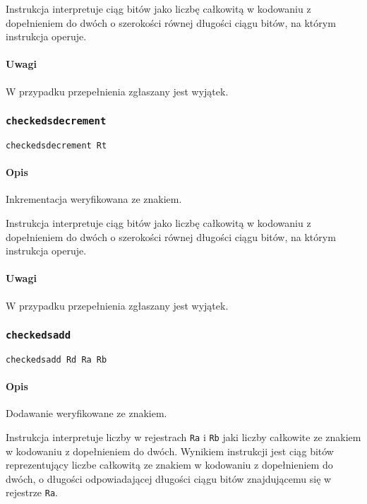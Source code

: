 Instrukcja interpretuje ciąg bitów jako liczbę całkowitą w kodowaniu z
dopełnieniem do dwóch o szerokości równej długości ciągu bitów, na którym
instrukcja operuje.

\paragraph*{Uwagi}

W przypadku przepełnienia zgłaszany jest wyjątek.

\subsubsection{\texttt{checkedsdecrement}}

\begin{lstlisting}
checkedsdecrement Rt
\end{lstlisting}

\paragraph*{Opis} Inkrementacja weryfikowana ze znakiem.

Instrukcja interpretuje ciąg bitów jako liczbę całkowitą w kodowaniu z
dopełnieniem do dwóch o szerokości równej długości ciągu bitów, na którym
instrukcja operuje.

\paragraph*{Uwagi}

W przypadku przepełnienia zgłaszany jest wyjątek.

\subsubsection{\texttt{checkedsadd}}

\begin{lstlisting}
checkedsadd Rd Ra Rb
\end{lstlisting}

\paragraph*{Opis} Dodawanie weryfikowane ze znakiem.

Instrukcja interpretuje liczby w rejestrach \texttt{Ra} i \texttt{Rb} jaki
liczby całkowite ze znakiem w kodowaniu z dopełnieniem do dwóch. Wynikiem
instrukcji jest ciąg bitów reprezentujący liczbe całkowitą ze znakiem w
kodowaniu z dopełnieniem do dwóch, o długości odpowiadającej długości ciągu
bitów znajdującemu się w rejestrze \texttt{Ra}.

